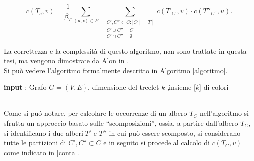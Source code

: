 \begin{equation}\label{conta}
	c(T_c,v)=\frac{1}{\beta_T}\sum_{(u,v)\in E} \;\; \sum_{\substack{C', C'' \subset C : |C'| = |T'| \\C' \cup C'' = C  \\ C' \cap C'' = \emptyset}}c(T'_{C'},v)\cdot c(T''_{C''},u).
\end{equation}

 La correttezza e la complessit\`a di questo algoritmo, non sono trattate in questa tesi, ma vengono dimostrate da Alon in \cite{alon1995color}.\\
 Si pu\`o vedere l'algoritmo formalmente  descritto in Algoritmo \ref{algoritmo}.\\


\begin{algorithm}[H]
	\caption{Algoritmo di costruzione per i $ k $-treelet in $ T $}
	\label{algoritmo}
	\SetAlgoLined
 	\textbf{input} : Grafo $ G =(V,E) $, dimensione del treelet $ k $ ,insieme [$ k $] di colori\;	
 			
\end{algorithm}\mbox{}\\

Come si pu\'o notare, per calcolare le occorrenze di un albero $ T_C $ nell'algoritmo si sfrutta un approccio basato sulle ``scomposizioni'', ossia, a partire dall'albero $ T_C $, si identificano i due alberi $ T' $ e $ T'' $ in cui pu\`o essere scomposto, si considerano tutte le partizioni di $ C',C'' \subset C $ e in seguito si procede al calcolo di $ c(T_C,v) $ come indicato in \eqref{conta}.

